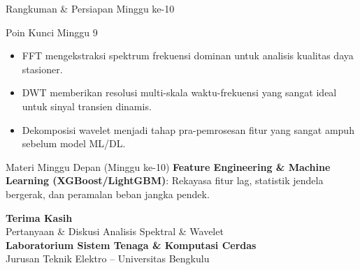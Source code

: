 \documentclass[aspectratio=169, 10pt]{beamer}
\begin{document}
\begin{frame}{Rangkuman \& Persiapan Minggu ke-10}
    \begin{block}{Poin Kunci Minggu 9}
        \begin{itemize}
            \item FFT mengekstraksi spektrum frekuensi dominan untuk analisis kualitas daya stasioner.
            \item DWT memberikan resolusi multi-skala waktu-frekuensi yang sangat ideal untuk sinyal transien dinamis.
            \item Dekomposisi wavelet menjadi tahap pra-pemrosesan fitur yang sangat ampuh sebelum model ML/DL.
        \end{itemize}
    \end{block}
    \vspace{0.2cm}
    \begin{alertblock}{Materi Minggu Depan (Minggu ke-10)}
        \textbf{Feature Engineering \& Machine Learning (XGBoost/LightGBM)}: Rekayasa fitur lag, statistik jendela bergerak, dan peramalan beban jangka pendek.
    \end{alertblock}
\end{frame}

\begin{frame}[plain]
    \begin{center}
        \vspace{1.5cm}
        {\Huge \color{mainblue} \textbf{Terima Kasih}}\\[0.4cm]
        {\large Pertanyaan \& Diskusi Analisis Spektral \& Wavelet}\\[1.2cm]
        \textbf{Laboratorium Sistem Tenaga \& Komputasi Cerdas}\\
        Jurusan Teknik Elektro -- Universitas Bengkulu
    \end{center}
\end{frame}
\end{document}
